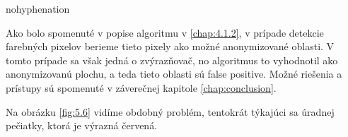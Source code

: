 \begin{hyphenrules}{nohyphenation}
\begin{figure}[H]
\begin{minipage}[b]{.5\linewidth}
\end{minipage}
\end{figure}

Ako bolo spomenuté v popise algoritmu v \ref{chap:4.1.2}, v prípade detekcie farebných pixelov berieme tieto pixely ako možné anonymizované oblasti. V tomto prípade sa však jedná o zvýrazňovač, no algoritmus to vyhodnotil ako anonymizovanú plochu, a teda tieto oblasti sú false positive. Možné riešenia a prístupy sú spomenuté v záverečnej kapitole \ref{chap:conclusion}.
\newline

Na obrázku \ref{fig:5.6} vidíme obdobný problém, tentokrát týkajúci sa úradnej pečiatky, ktorá je výrazná červená. 


\end{hyphenrules}
